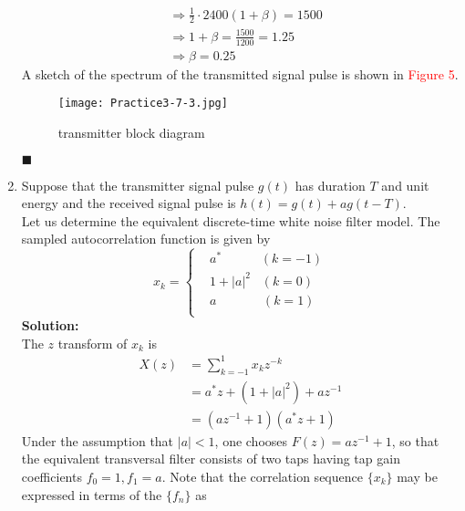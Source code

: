 \documentclass[a4paper,12pt]{article}
\begin{document}
\begin{enumerate}
\begin{align*}
                & \Rightarrow \frac{1}{2} \cdot 2400 (1 + \beta) = 1500 \\
                & \Rightarrow 1 + \beta = \frac{1500}{1200} = 1.25 \\ 
                & \Rightarrow \beta = 0.25
            \end{align*}
            \newpage
            A sketch of the spectrum of the transmitted signal pulse is shown in \textcolor{red}{Figure 5}. 
            \begin{figure}[h]
            	\centering
            	\texttt{[image: Practice3-7-3.jpg]}
            	\textcolor{red}{\caption{transmitter block diagram}}
            \end{figure}
            \begin{flushright}
                $\blacksquare$
            \end{flushright}
        \item 
            Suppose that the transmitter signal pulse $g(t)$ has duration $T$ and unit energy and the received signal pulse is $h(t) = g(t) + ag(t - T)$. \\ 
            Let us determine the equivalent discrete-time white noise filter model. The sampled autocorrelation function is given by 
            $$x_k = \left\{ 
            \begin{aligned}
                & a^* \;\;\;\;\;\;\;\;\;\;\; (k = -1) \\
                & 1 + |a|^2 \;\;\; (k = 0) \\ 
                & a \;\;\;\;\;\;\;\;\;\;\;\;\; (k = 1) \\
            \end{aligned}
            \right.
            $$
            \textbf{Solution:} \\ 
            The $z$ transform of $x_k$ is 
            \begin{align*}
                X(z) &= \sum_{k = -1}^{1} x_k z^{-k} \\
                     &= a^*z + (1 + |a|^2) + az^{-1} \\ 
                     &= (az^{-1} + 1)(a^*z + 1) 
            \end{align*}
            Under the assumption that $|a| < 1$, one chooses $F(z) = az^{-1} + 1$, so that the equivalent transversal filter consists of two taps having tap gain coefficients $f_0 = 1, f_1 = a$. Note that the correlation sequence $\{ x_k \}$ may be expressed in terms of the $\{ f_n \}$ as 

\end{enumerate}
\end{document}
